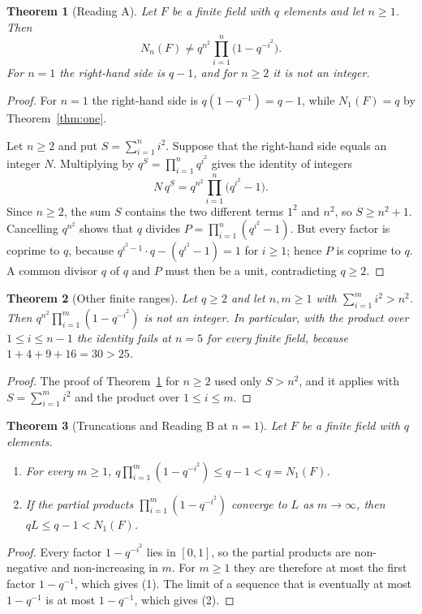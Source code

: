 \documentclass[11pt]{article}
\newtheorem{theorem}{Theorem}
\theoremstyle{remark}
\begin{document}
\begin{theorem}[Reading A]\label{thm:A}
Let $F$ be a finite field with $q$ elements and let $n\ge1$. Then
\[
 N_n(F)\ne q^{n^2}\prod_{i=1}^{n}\bigl(1-q^{-i^2}\bigr).
\]
For $n=1$ the right-hand side is $q-1$, and for $n\ge2$ it is not an
integer.
\end{theorem}
\begin{proof}
For $n=1$ the right-hand side is $q(1-q^{-1})=q-1$, while $N_1(F)=q$ by
Theorem~\ref{thm:one}.

Let $n\ge2$ and put $S=\sum_{i=1}^n i^2$. Suppose that the right-hand
side equals an integer $N$. Multiplying by $q^{S}=\prod_{i=1}^n q^{i^2}$
gives the identity of integers
\[
 N\,q^{S}=q^{n^2}\prod_{i=1}^{n}\bigl(q^{i^2}-1\bigr).
\]
Since $n\ge2$, the sum $S$ contains the two different terms $1^2$ and
$n^2$, so $S\ge n^2+1$. Cancelling $q^{n^2}$ shows that $q$ divides
$P=\prod_{i=1}^n(q^{i^2}-1)$. But every factor is coprime to $q$,
because $q^{i^2-1}\cdot q-(q^{i^2}-1)=1$ for $i\ge1$; hence $P$ is
coprime to $q$. A common divisor $q$ of $q$ and $P$ must then be a
unit, contradicting $q\ge2$.
\end{proof}

\begin{theorem}[Other finite ranges]\label{thm:C}
Let $q\ge2$ and let $n,m\ge1$ with $\sum_{i=1}^{m}i^2>n^2$. Then
$q^{n^2}\prod_{i=1}^{m}(1-q^{-i^2})$ is not an integer. In particular,
with the product over $1\le i\le n-1$ the identity fails at $n=5$ for
every finite field, because $1+4+9+16=30>25$.
\end{theorem}
\begin{proof}
The proof of Theorem~\ref{thm:A} for $n\ge2$ used only $S>n^2$, and it
applies with $S=\sum_{i=1}^{m}i^2$ and the product over $1\le i\le m$.
\end{proof}

\begin{theorem}[Truncations and Reading B at $n=1$]\label{thm:B}
Let $F$ be a finite field with $q$ elements.
\begin{enumerate}
\item For every $m\ge1$,
 $q\prod_{i=1}^{m}(1-q^{-i^2})\le q-1<q=N_1(F)$.
\item If the partial products $\prod_{i=1}^{m}(1-q^{-i^2})$ converge to
 $L$ as $m\to\infty$, then $qL\le q-1<N_1(F)$.
\end{enumerate}
\end{theorem}
\begin{proof}
Every factor $1-q^{-i^2}$ lies in $[0,1]$, so the partial products are
non-negative and non-increasing in $m$. For $m\ge1$ they are therefore
at most the first factor $1-q^{-1}$, which gives (1). The limit of a
sequence that is eventually at most $1-q^{-1}$ is at most $1-q^{-1}$,
which gives (2).
\end{proof}
\end{document}
